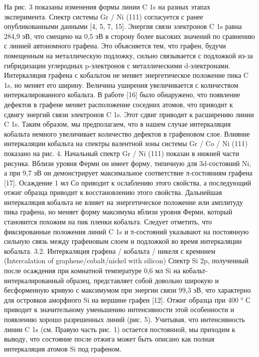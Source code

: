 На рис. 3 показаны изменения формы линии C 1s на разных этапах эксперимента. Спектр системы Gr / Ni (111) согласуется с ранее опубликованными данными [4, 5, 7, 15]. Энергия связи электронов C 1s равна 284,9 эВ, что смещено на 0,5 эВ в сторону более высоких значений по сравнению с линией автономного графена. Это объясняется тем, что графен, будучи помещенным на металлическую подложку, сильно связывается с подложкой из-за гибридизации углеродных p-электронов с металлическими d-электронами. Интеркаляция графена с кобальтом не меняет энергетическое положение пика C 1s, но меняет его ширину. Величина уширения увеличивается с количеством интеркалированного кобальта. В работе [16] было обнаружено, что появление дефектов в графене меняет расположение соседних атомов, что приводит к сдвигу энергий связи электронов C 1s. Этот сдвиг приводит к расширению линии C 1s. Таким образом, мы предполагаем, что в нашем случае интеркаляция кобальта немного увеличивает количество дефектов в графеновом слое. 
Влияние интеркаляции кобальта на спектры валентной зоны системы Gr / Co / Ni (111) показано на рис. 4. Начальный спектр Gr / Ni (111) показан в нижней части рисунка. Вблизи уровня Ферми он имеет форму, типичную для 3d-состояний Ni, а при 9,7 эВ он демонстрирует максимальное соответствие π-состояниям графена [17]. Осаждение 1 мл Со приводит к ослаблению этого свойства, а последующий отжиг образца приводит к восстановлению этого свойства. Дальнейшая интеркаляция кобальта не влияет на энергетическое положение или амплитуду пика графена, но меняет форму максимума вблизи уровня Ферми, который становится похожим на пик пленки кобальта. Следует отметить, что фиксированные положения линий C 1s и π-состояний указывают на постоянную сильную связь между графеновым слоем и подложкой во время интеркаляции кобальта. 
3.2. Интеркаляция графена / кобальта / никеля с кремнием (Intercalation of graphene/cobalt/nickel with silicon)
Спектр Si 2p, полученный после осаждения при комнатной температуре 0,6 мл Si на кобальт-интеркалированный образец, представляет собой довольно широкую и бесформенную кривую с максимумом при энергии связи 99,3 эВ, что характерно для островков аморфного Si на вершине графен [12]. Отжиг образца при 400 ° С приводит к значительному уменьшению интенсивности этой особенности и появлению хорошо разрешенных линий (рис. 5). Учитывая, что интенсивность линии C 1s (см. Правую часть рис. 1) остается постоянной, мы приходим к выводу, что состояние после отжига может быть описано как полная интеркаляция атомов Si под графеном. 

